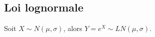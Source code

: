 \documentclass[10pt, french]{article}
\begin{document}
\begin{multicols*}{2}
\setcounter{section}{17}
\section{Loi lognormale}
Soit $X \sim N(\mu, \sigma)$, alors $Y = e^{X} \sim LN(\mu, \sigma)$. 











\end{multicols*}

\end{document}

